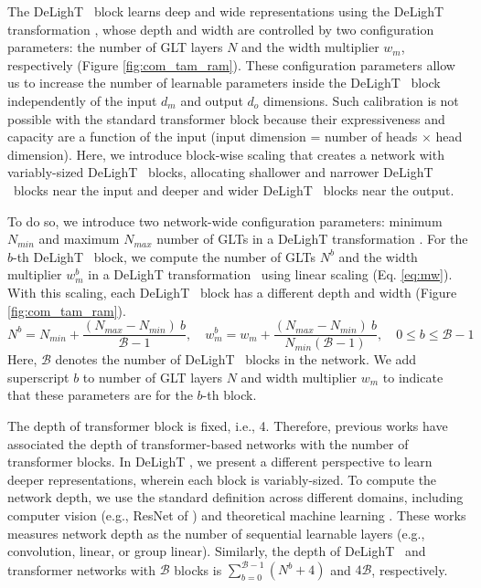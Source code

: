  The DeLighT ~block learns deep and wide representations using the DeLighT transformation , whose depth and width are controlled by two configuration parameters: the number of GLT layers $N$ and the width multiplier $w_m$, respectively (Figure \ref{fig:com_tam_ram}). These configuration parameters allow us to increase the number of learnable parameters inside the DeLighT ~block independently of the input $d_m$ and output $d_o$ dimensions. Such calibration is not possible with the standard transformer block because their expressiveness and capacity are a function of the input (input dimension = number of heads $\times$ head dimension). Here, we introduce block-wise scaling that creates a network with variably-sized DeLighT ~blocks, allocating shallower and narrower DeLighT ~blocks near the input and deeper and wider DeLighT ~blocks near the output.

To do so, we introduce two network-wide configuration parameters: minimum $N_{min}$ and maximum $N_{max}$ number of GLTs in a DeLighT transformation . For the $b$-th DeLighT ~block, we  compute the number of GLTs $N^b$ and the width multiplier $w_m^b$ in a DeLighT transformation ~using linear scaling (Eq. \ref{eq:mw}). With this scaling, each DeLighT ~block has a different depth and width (Figure \ref{fig:com_tam_ram}). 
\begin{equation}
       N^{b} = N_{min} + \frac{(N_{max} - N_{min})\ b}{\mathcal{B}-1}, \quad w_m^{b} =  w_m + \frac{(N_{max} - N_{min})\ b}{N_{min}(\mathcal{B}-1)}, \quad 0 \le b \le \mathcal{B}-1
    \label{eq:mw}
\end{equation}
Here, $\mathcal{B}$ denotes the number of DeLighT ~blocks in the network. We add superscript $b$ to number of GLT layers $N$ and width multiplier $w_m$ to indicate that these parameters are for the $b$-th block. 

 The depth of transformer block is fixed, i.e., 4. Therefore, previous works \citep{raffel2019exploring,brown2020language,wang2019learning} have associated the depth of transformer-based networks with the number of transformer blocks. In DeLighT , we present a different perspective to learn deeper representations, wherein each block is variably-sized. To compute the network depth, we use the standard definition across different domains, including computer vision (e.g., ResNet of \citealt{he2016deep}) and theoretical machine learning \citep{telgarsky2016benefits}. These works measures network depth as the number of sequential learnable layers (e.g., convolution, linear, or group linear). Similarly, the depth of DeLighT ~and transformer networks with $\mathcal{B}$ blocks is $\sum_{b=0}^{\mathcal{B}-1} (N^b + 4)$ and $4\mathcal{B}$, respectively.

